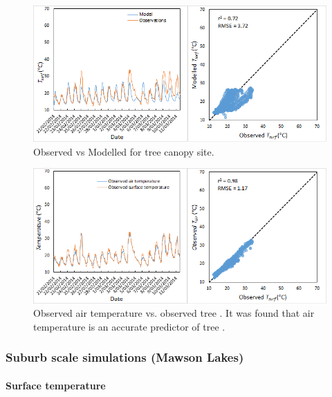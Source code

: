 \documentclass[final,3p,times,authoryear]{elsarticle}
\begin{document}
\begin{figure}[!htbp]
\includegraphics[trim=0mm 0mm 0mm 0mm, clip,scale=0.68]{images/treeobs.png}
 \caption{Observed vs Modelled  for tree canopy site.} \label{fig:treeobs}
\end{figure}

\begin{figure}[!htbp]
\includegraphics[trim=0mm 0mm 0mm 0mm, clip,scale=0.88]{images/airtreeobs.png}
 \caption{Observed air temperature vs. observed tree . It was found that air temperature is an accurate predictor of tree .} \label{fig:airtreeobs}
\end{figure}


\subsubsection{Suburb scale simulations (Mawson Lakes)}\label{sec:suburbresult} 
\paragraph{Surface temperature}\label{sec:surftempresult} 
\end{document}
